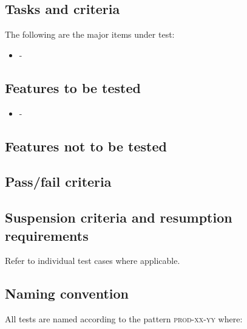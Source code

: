 \documentclass[DM,lsstdraft,STS,toc]{lsstdoc}
\begin{document}
\subsection{Tasks and criteria}
\label{sec:tasks}

The following are the major items under test:

\begin{itemize}

\item{-}

\end{itemize}

\subsection{Features to be tested}
\label{sec:feat2test}

\begin{itemize}

\item{-}

\end{itemize}

\subsection{Features not to be tested}
\label{sec:featnot2test}


\subsection{Pass/fail criteria}
\label{sec:passfail}


\subsection{Suspension criteria and resumption requirements}
\label{suspension}

Refer to individual test cases where applicable.

\subsection{Naming convention}

All tests are named according to the pattern \textsc{prod-xx-yy} where:


\end{document}
